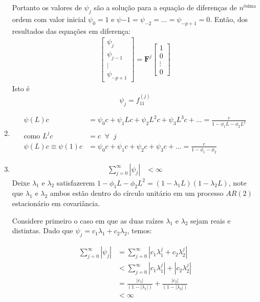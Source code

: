 \begin{enumerate}
		Portanto os valores de $\psi_j$ são a solução para a equação de diferenças de $n^{\text{ésima}}$ ordem com valor inicial $\psi_0=1$ e $\psi{-1}=\psi_{-2}=...=\psi_{-p+1}=0$. Então, dos resultados das equações em diferença:
		\begin{align*}
		\begin{bmatrix}
			\psi_j\\
			\psi_{j-1}\\
			\vdots\\
			\psi_{-p+1}
		\end{bmatrix}
		=
		\mathbf{F}^j\begin{bmatrix}
			1\\
			0\\
			\vdots\\
			0
		\end{bmatrix}
		\end{align*}
		Isto é $$\psi_j=f_{11}^{(j)}$$
		
		\item %
		
		\begin{align*}
			\psi(L)c&=\psi_0c+\psi_1Lc+\psi_2L^2c+\psi_3L^3c+...
			=\frac{c}{1-\phi_1L-\phi_2L^2}\\
			\text{como } L^jc&=c \;\; \forall \;\;j\\
			\psi(L)c\equiv\psi(1)c&=\psi_0c+\psi_1c+\psi_2c+\psi_3c+...
			=\frac{c}{1-\phi_1-\phi_2}			
		\end{align*}
		
		\item %
		\begin{align*}
		\sum \limits_{j=0}^{\infty}|\psi_j|&<\infty			
		\end{align*}
		Deixe $\lambda_1$ e $\lambda_2$ satisfazerem $1-\phi_1L-\phi_2L^2=(1-\lambda_1L)(1-\lambda_2L)$, note que $\lambda_1$ e $\lambda_2$ ambos estão dentro do círculo unitário em um processo $AR(2)$ estacionário em covariância.
		
		Considere primeiro o caso em que as duas raízes $\lambda_1$ e $\lambda_2$ sejam reais e  distintas. Dado que $\psi_j=c_1\lambda_1+c_2\lambda_2$, temos:
		
			\begin{align*}
				\sum \limits_{j=0}^{\infty}|\psi_j|&=\sum \limits_{j=0}^{\infty}|c_1\lambda_1^j+c_2\lambda^j_2|\\
				&<\sum \limits_{j=0}^{\infty}|c_1\lambda_1^j|+|c_2\lambda_2^j|\\
				&=\frac{|c_1|}{(1-|\lambda_1|)}+\frac{|c_2|}{(1-|\lambda_2|)}\\
				&<\infty
			\end{align*}
			

\end{enumerate}

